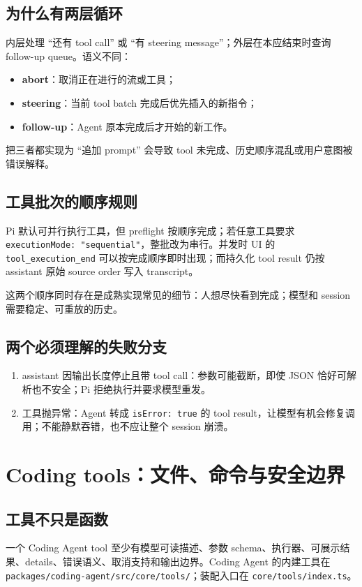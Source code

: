 \documentclass[UTF8,openany,11pt]{ctexbook}
\newcommand{\pathref}[1]{\texttt{#1}}
\newcommand{\term}[1]{\textbf{#1}}
\begin{document}
\section{为什么有两层循环}
内层处理 ``还有 tool call'' 或 ``有 steering message''；外层在本应结束时查询 follow-up queue。语义不同：
\begin{itemize}
\item \term{abort}：取消正在进行的流或工具；
\item \term{steering}：当前 tool batch 完成后优先插入的新指令；
\item \term{follow-up}：Agent 原本完成后才开始的新工作。
\end{itemize}
把三者都实现为 ``追加 prompt'' 会导致 tool 未完成、历史顺序混乱或用户意图被错误解释。

\section{工具批次的顺序规则}
Pi 默认可并行执行工具，但 preflight 按顺序完成；若任意工具要求 \texttt{executionMode: "sequential"}，整批改为串行。并发时 UI 的 \texttt{tool\_execution\_end} 可以按完成顺序即时出现；而持久化 tool result 仍按 assistant 原始 source order 写入 transcript。

这两个顺序同时存在是成熟实现常见的细节：人想尽快看到完成；模型和 session 需要稳定、可重放的历史。

\section{两个必须理解的失败分支}
\begin{enumerate}
\item assistant 因输出长度停止且带 tool call：参数可能截断，即使 JSON 恰好可解析也不安全；Pi 拒绝执行并要求模型重发。
\item 工具抛异常：Agent 转成 \texttt{isError: true} 的 tool result，让模型有机会修复调用；不能静默吞错，也不应让整个 session 崩溃。
\end{enumerate}

\chapter{Coding tools：文件、命令与安全边界}

\section{工具不只是函数}
一个 Coding Agent tool 至少有模型可读描述、参数 schema、执行器、可展示结果、details、错误语义、取消支持和输出边界。Coding Agent 的内建工具在 \pathref{packages/coding-agent/src/core/tools/}；装配入口在 \pathref{core/tools/index.ts}。
\end{document}
